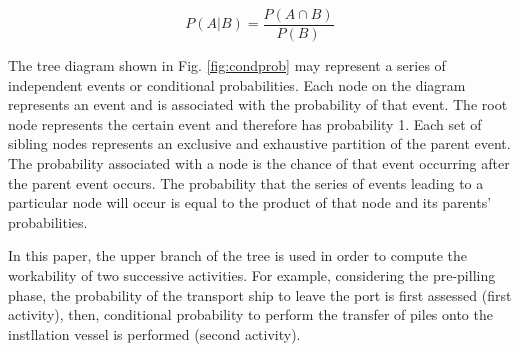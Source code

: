 \begin{equation}
\label{eqn:kolmogorov}
P \left(A \vert B \right) = \frac{P \left(A \cap B \right)}{P \left( B \right)}
\end{equation}

The tree diagram shown in Fig. \ref{fig:condprob} may represent a series of independent events or conditional probabilities. Each node on the diagram represents an event and is associated with the probability of that event. The root node represents the certain event and therefore has probability 1. Each set of sibling nodes represents an exclusive and exhaustive partition of the parent event. The probability associated with a node is the chance of that event occurring after the parent event occurs. The probability that the series of events leading to a particular node will occur is equal to the product of that node and its parents' probabilities.

In this paper, the upper branch of the tree is used in order to compute the workability of two successive activities. For example, considering the pre-pilling phase, the probability of the transport ship to leave the port is first assessed (first activity), then, conditional probability to perform the transfer of piles onto the instllation vessel is performed (second activity).